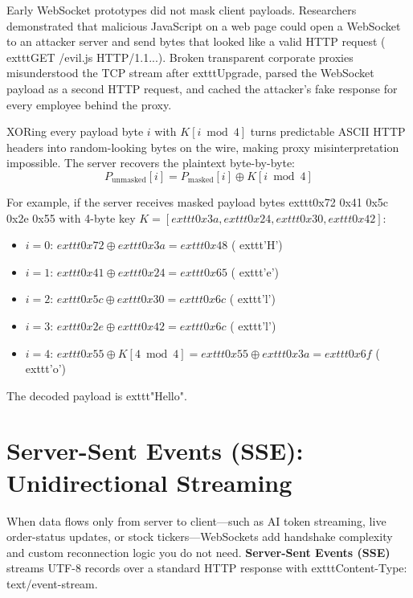 \begin{underthehoodbox}
Early WebSocket prototypes did not mask client payloads. Researchers demonstrated that malicious JavaScript on a web page could open a WebSocket to an attacker server and send bytes that looked like a valid HTTP request (	exttt{GET /evil.js HTTP/1.1...}). Broken transparent corporate proxies misunderstood the TCP stream after 	exttt{Upgrade}, parsed the WebSocket payload as a second HTTP request, and cached the attacker's fake response for every employee behind the proxy.

XORing every payload byte $i$ with $K[i \bmod 4]$ turns predictable ASCII HTTP headers into random-looking bytes on the wire, making proxy misinterpretation impossible. The server recovers the plaintext byte-by-byte:
$$P_{\text{unmasked}}[i] = P_{\text{masked}}[i] \oplus K[i \bmod 4]$$
\end{underthehoodbox}

For example, if the server receives masked payload bytes 	exttt{0x72 0x41 0x5c 0x2e 0x55} with 4-byte key $K = [	exttt{0x3a}, 	exttt{0x24}, 	exttt{0x30}, 	exttt{0x42}]$:
\begin{itemize}[leftmargin=15pt]
  \item $i=0$: $	exttt{0x72} \oplus 	exttt{0x3a} = 	exttt{0x48}$ (	exttt{'H'})
  \item $i=1$: $	exttt{0x41} \oplus 	exttt{0x24} = 	exttt{0x65}$ (	exttt{'e'})
  \item $i=2$: $	exttt{0x5c} \oplus 	exttt{0x30} = 	exttt{0x6c}$ (	exttt{'l'})
  \item $i=3$: $	exttt{0x2e} \oplus 	exttt{0x42} = 	exttt{0x6c}$ (	exttt{'l'})
  \item $i=4$: $	exttt{0x55} \oplus K[4 \bmod 4] = 	exttt{0x55} \oplus 	exttt{0x3a} = 	exttt{0x6f}$ (	exttt{'o'})
\end{itemize}
The decoded payload is 	exttt{"Hello"}.

\section{Server-Sent Events (SSE): Unidirectional Streaming}

When data flows only from server to client---such as AI token streaming, live order-status updates, or stock tickers---WebSockets add handshake complexity and custom reconnection logic you do not need. \textbf{Server-Sent Events (SSE)} streams UTF-8 records over a standard HTTP response with 	exttt{Content-Type: text/event-stream}.

